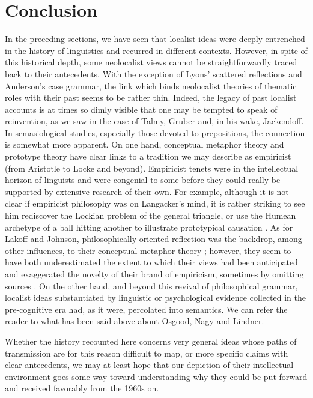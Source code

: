 \documentclass[english,output=paper,colorlinks,citecolor=brown]{../langscibook}
\begin{document}
\section{Conclusion}

In the preceding sections, we have seen that localist ideas were deeply entrenched in the history of linguistics and recurred in different contexts. However, in spite of this historical depth, some neolocalist views cannot be straightforwardly traced back to their antecedents. With the exception of Lyons’ scattered reflections and Anderson’s case grammar, the link which binds neolocalist theories of thematic roles with their past seems to be rather thin. Indeed, the legacy of past localist accounts is at times so dimly visible that one may be tempted to speak of reinvention, as we saw in the case of Talmy, Gruber and, in his wake, Jackendoff. In semasiological studies, especially those devoted to prepositions, the connection is somewhat more apparent. On one hand, conceptual metaphor theory and prototype theory have clear links to a tradition we may describe as empiricist (from Aristotle to Locke and beyond). Empiricist tenets were in the intellectual horizon of linguists and were congenial to some before they could really be supported by extensive research of their own. For example, although it is not clear if empiricist philosophy was on Langacker’s mind, it is rather striking to see him rediscover the Lockian problem of the general triangle, or use the Humean archetype of a ball hitting another to illustrate prototypical causation \citep[13]{Langacker1991}. As for Lakoff and Johnson, philosophically oriented reflection was the backdrop, among other influences, to their conceptual metaphor theory \citep{Johnson1981}; however, they seem to have both underestimated the extent to which their views had been anticipated and exaggerated the novelty of their brand of empiricism, sometimes by omitting sources \citep{Fortis2018Prototype}. On the other hand, and beyond this revival of philosophical grammar, localist ideas substantiated by linguistic or psychological evidence collected in the pre-cognitive era had, as it were, percolated into semantics. We can refer the reader to what has been said above about Osgood, Nagy and Lindner. 

Whether the history recounted here concerns very general ideas whose paths of transmission are for this reason difficult to map, or more specific claims with clear antecedents, we may at least hope that our depiction of their intellectual environment goes some way toward understanding why they could be put forward and received favorably from the 1960s on. 


{\sloppy\printbibliography[heading=subbibliography,notkeyword=this]}
\end{document}
